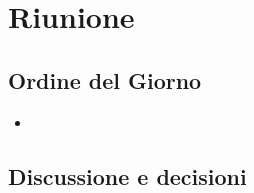 \section{Riunione}
\subsection{Ordine del Giorno}
\begin{itemize}
	\item 
\end{itemize}

\subsection{Discussione e decisioni}
\subsubsection{}

\clearpage
